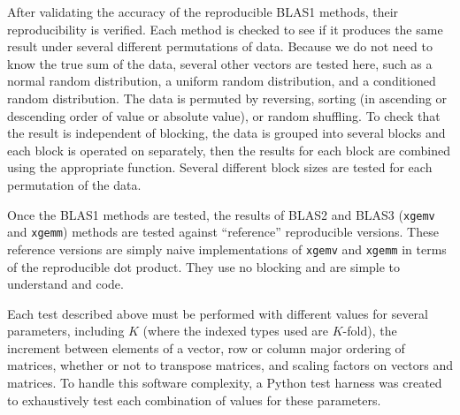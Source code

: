   After validating the accuracy of the reproducible BLAS1 methods, their reproducibility is verified. Each method is checked to see if it produces the same result under several different permutations of data. Because we do not need to know the true sum of the data, several other vectors are tested here, such as a normal random distribution, a uniform random distribution, and a conditioned random distribution. The data is permuted by reversing, sorting (in ascending or descending order of value or absolute value), or random shuffling. To check that the result is independent of blocking, the data is grouped into several blocks and each block is operated on separately, then the results for each block are combined using the appropriate function. Several different block sizes are tested for each permutation of the data.

  Once the BLAS1 methods are tested, the results of BLAS2 and BLAS3 (\texttt{xgemv} and \texttt{xgemm}) methods are tested against ``reference'' reproducible versions. These reference versions are simply naive implementations of \texttt{xgemv} and \texttt{xgemm} in terms of the reproducible dot product. They use no blocking and are simple to understand and code.

  Each test described above must be performed with different values for several parameters, including $K$ (where the indexed types used are $K$-fold), the increment between elements of a vector, row or column major ordering of matrices, whether or not to transpose matrices, and scaling factors on vectors and matrices. To handle this software complexity, a Python test harness was created to exhaustively test each combination of values for these parameters.
